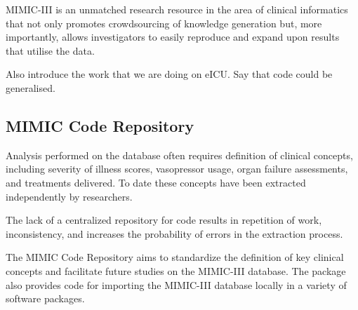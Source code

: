 \documentclass{bioinfo}
\begin{document}
MIMIC-III is an unmatched research resource in the area of clinical informatics that not only promotes crowdsourcing of knowledge generation but, more importantly, allows investigators to easily reproduce and expand upon results that utilise the data. 

Also introduce the work that we are doing on eICU. Say that code could be generalised.

\subsection{MIMIC Code Repository}


Analysis performed on the database often requires definition of clinical concepts, including severity of illness scores, vasopressor usage, organ failure assessments, and treatments delivered. To date these concepts have been extracted independently by researchers. 

The lack of a centralized repository for code results in repetition of work, inconsistency, and increases the probability of errors in the extraction process. 

The MIMIC Code Repository aims to standardize the definition of key clinical concepts and facilitate future studies on the MIMIC-III database. The package also provides code for importing the MIMIC-III database locally in a variety of software packages.
\end{document}
